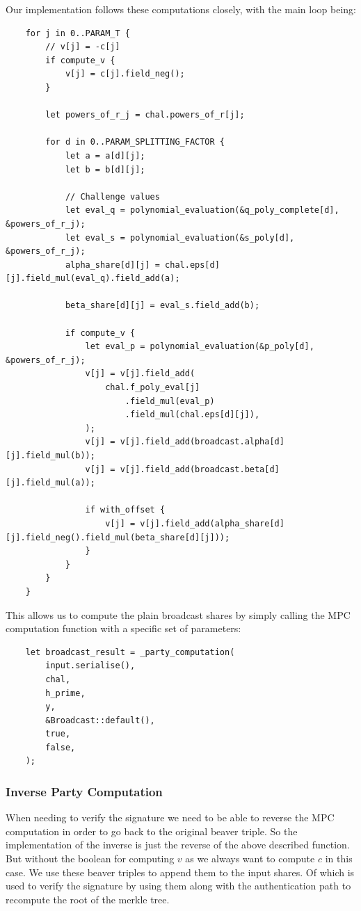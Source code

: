 \documentclass[11pt]{report}
\theoremstyle{definition}
\theoremstyle{plain}
\begin{document}
Our implementation follows these computations closely, with the main loop being:
\begin{verbatim}
    for j in 0..PARAM_T {
        // v[j] = -c[j]
        if compute_v {
            v[j] = c[j].field_neg();
        }

        let powers_of_r_j = chal.powers_of_r[j];

        for d in 0..PARAM_SPLITTING_FACTOR {
            let a = a[d][j];
            let b = b[d][j];

            // Challenge values
            let eval_q = polynomial_evaluation(&q_poly_complete[d], &powers_of_r_j);
            let eval_s = polynomial_evaluation(&s_poly[d], &powers_of_r_j);
            alpha_share[d][j] = chal.eps[d][j].field_mul(eval_q).field_add(a);

            beta_share[d][j] = eval_s.field_add(b);

            if compute_v {
                let eval_p = polynomial_evaluation(&p_poly[d], &powers_of_r_j);
                v[j] = v[j].field_add(
                    chal.f_poly_eval[j]
                        .field_mul(eval_p)
                        .field_mul(chal.eps[d][j]),
                );
                v[j] = v[j].field_add(broadcast.alpha[d][j].field_mul(b));
                v[j] = v[j].field_add(broadcast.beta[d][j].field_mul(a));

                if with_offset {
                    v[j] = v[j].field_add(alpha_share[d][j].field_neg().field_mul(beta_share[d][j]));
                }
            }
        }
    }
\end{verbatim}

This allows us to compute the plain broadcast shares by simply calling the MPC computation function with a specific set of parameters:
\begin{verbatim}
    let broadcast_result = _party_computation(
        input.serialise(),
        chal,
        h_prime,
        y,
        &Broadcast::default(),
        true,
        false,
    );
\end{verbatim}

\subsubsection{Inverse Party Computation}
When needing to verify the signature we need to be able to reverse the MPC computation in order to go back to the original beaver triple. So the implementation of the inverse is just the reverse of the above described function. But without the boolean for computing $v$ as we always want to compute $c$ in this case. We use these beaver triples to append them to the input shares. Of which is used to verify the signature by using them along with the authentication path to recompute the root of the merkle tree.
\end{document}
